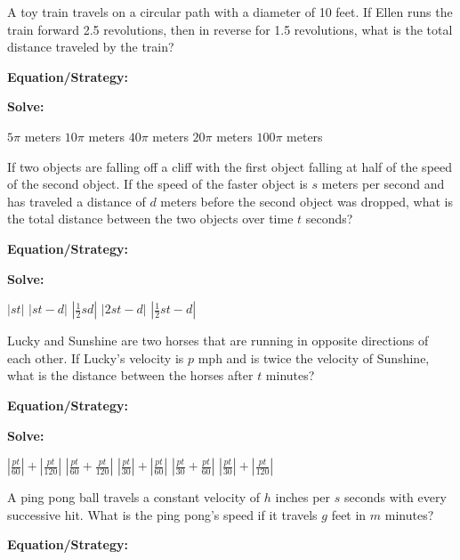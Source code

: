 \vfill
\newpage
\begin{multicols*}{2}
\begin{outline}[enumerate]
\medium

\1 A toy train travels on a circular path with a diameter of 10 feet. If Ellen runs the train forward 2.5 revolutions, then in reverse for 1.5 revolutions, what is the total distance traveled by the train?

\bigskip
\textbf{Equation/Strategy:} \hrulefill

\bigskip
\textbf{Solve:}

\vfill
\2 $5\pi$ meters
\2 $10\pi$ meters
\2 $40\pi$ meters
\2 $20\pi$ meters
\2 $100\pi$ meters

\midline

\1 If two objects are falling off a cliff with the first object falling at half of the speed of the second object. If the speed of the faster object is $s$ meters per second and has traveled a distance of $d$ meters before the second object was dropped, what is the total distance between the two objects over time $t$ seconds?

\bigskip
\textbf{Equation/Strategy:} \hrulefill

\bigskip
\textbf{Solve:}

\vfill
\2 $|st|$
\2 $|st-d|$
\2 $\left|\frac{1}{2}sd\right|$
\2 $|2st-d|$
\2 $\left|\frac{1}{2}st-d\right|$

\columnbreak
\advanced

\1 Lucky and Sunshine are two horses that are running in opposite directions of each other. If Lucky's velocity is $p$ mph and is twice the velocity of Sunshine, what is the distance between the horses after $t$ minutes?

\bigskip
\textbf{Equation/Strategy:} \hrulefill

\bigskip
\textbf{Solve:}

\vfill
\2 $\left|\frac{pt}{60}\right|+\left|\frac{pt}{120}\right|$
\2 $\left|\frac{pt}{60}+\frac{pt}{120}\right|$
\2 $\left|\frac{pt}{30}\right|+\left|\frac{pt}{60}\right|$
\2 $\left|\frac{pt}{30}+\frac{pt}{60}\right|$
\2 $\left|\frac{pt}{30}\right|+\left|\frac{pt}{120}\right|$

\midline

\1 A ping pong ball travels a constant velocity of $h$ inches per $s$ seconds with every successive hit. What is the ping pong's speed if it travels $g$ feet in $m$ minutes?


\bigskip
\textbf{Equation/Strategy:} \hrulefill


\end{outline}
\end{multicols*}
